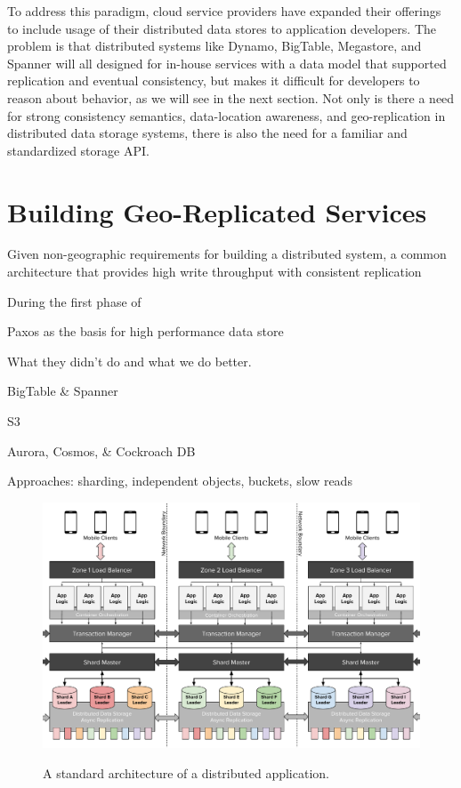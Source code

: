 To address this paradigm, cloud service providers have expanded their offerings to include usage of their distributed data stores to application developers.
The problem is that distributed systems like Dynamo, BigTable, Megastore, and Spanner will all designed for in-house services with a data model that supported replication and eventual consistency, but makes it difficult for developers to reason about behavior, as we will see in the next section.
Not only is there a need for strong consistency semantics, data-location awareness, and geo-replication in distributed data storage systems, there is also the need for a familiar and standardized storage API.


\section{Building Geo-Replicated Services}

Given non-geographic requirements for building a distributed system, a common architecture that provides high write throughput with consistent replication

During the first phase of

Paxos as the basis for high performance data store \cite{bolosky_paxos_2011}

What they didn't do and what we do better.

BigTable \& Spanner

S3

Aurora, Cosmos, \& Cockroach DB

Approaches: sharding, independent objects, buckets, slow reads

\begin{figure}
    \begin{center}
        \includegraphics[width=5in]{figures/ch02_distributed_architecture.pdf}
    \end{center}
    \renewcommand{\baselinestretch}{1}
    \small\normalsize

    \begin{quote}
        \caption[Distributed Architectures]{A standard architecture of a distributed application.}
        \label{fig:ch02_distributed_architecture}
    \end{quote}
\end{figure}
\renewcommand{\baselinestretch}{2}
\small\normalsize


